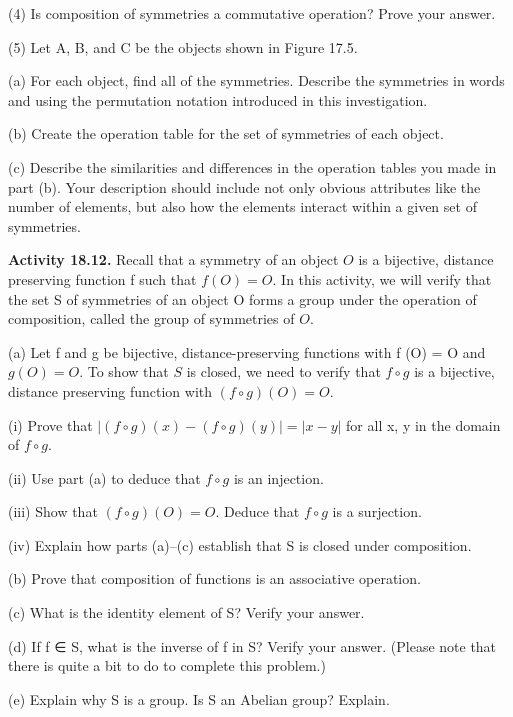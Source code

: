 \documentclass[11pt,a4paper]{article}
\begin{document}
(4) Is composition of symmetries a commutative operation? Prove your answer.


(5) Let A, B, and C be the objects shown in Figure 17.5.

(a) For each object, find all of the symmetries. Describe the symmetries in words and using the permutation notation introduced in this investigation.

(b) Create the operation table for the set of symmetries of each object.

(c) Describe the similarities and differences in the operation tables you made in part (b). Your description should include not only obvious attributes like the number of elements, but also how the elements interact within a given set of symmetries.


{\bf Activity 18.12.} Recall that a symmetry of an object $O$ is a bijective, distance preserving function f such that $f (O) = O$. In this activity, we will verify that the set S of symmetries of an object O forms a group under the operation of composition, called the group of symmetries of $O$.

(a) Let f and g be bijective, distance-preserving functions with f (O) = O
and $g(O) = O$. To show that $S$ is closed, we need to verify that $f \circ g$ is a
bijective, distance preserving function with $(f \circ g)(O) = O$.

(i) Prove that $|(f \circ g)(x) − (f \circ g)(y)| = |x − y|$ for all x, y in the
domain of $f \circ g$.

(ii) Use part (a) to deduce that $f \circ g$ is an injection.

(iii) Show that $(f \circ g)(O) = O$. Deduce that $f \circ g$ is a surjection.

(iv) Explain how parts (a)–(c) establish that S is closed under composition.

(b) Prove that composition of functions is an associative operation.

(c) What is the identity element of S? Verify your answer.

(d) If f ∈ S, what is the inverse of f in S? Verify your answer. (Please note
that there is quite a bit to do to complete this problem.)

(e) Explain why S is a group. Is S an Abelian group? Explain.
\end{document}
